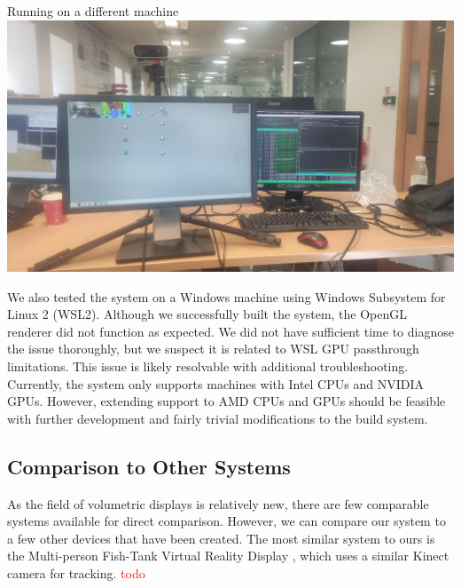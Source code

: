 \begin{figureBox}[label={fig:other-machine}, width=0.7\linewidth]{Running on a different machine}
	\includegraphics[width=1.0\linewidth]{./evaluation/figures/other-device.jpeg}
\end{figureBox}

We also tested the system on a Windows machine using Windows Subsystem for Linux 2 (WSL2). Although we successfully built the system, the OpenGL renderer did not function as expected. We did not have sufficient time to diagnose the issue thoroughly, but we suspect it is related to WSL GPU passthrough limitations. This issue is likely resolvable with additional troubleshooting. \\

Currently, the system only supports machines with Intel CPUs and NVIDIA GPUs. However, extending support to AMD CPUs and GPUs should be feasible with further development and fairly trivial modifications to the build system.

\subsection{Comparison to Other Systems}

As the field of volumetric displays is relatively new, there are few comparable systems available for direct comparison. However, we can compare our system to a few other devices that have been created. The most similar system to ours is the Multi-person Fish-Tank Virtual Reality Display \cite{10.1145/3281505.3281540} \cite{10.1145/169059.169066}, which uses a similar Kinect camera for tracking. \textcolor{red}{todo}


